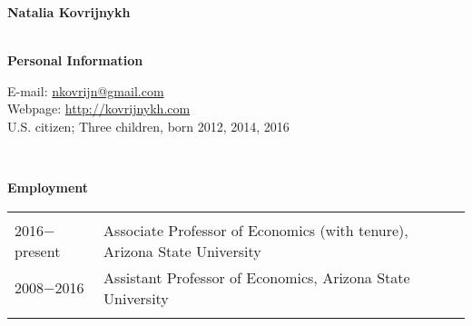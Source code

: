 \documentclass[11pt]{article}
\begin{document}
\begin{center}
{\Large\textbf{Natalia Kovrijnykh}}\\

{\large\textbf{}}\\
\end{center}


\vspace{.2cm}

\textbf{Personal Information}

\vspace{.3cm}

E-mail: \href{mailto:natalia.kovrijnykh@asu.edu}{nkovrijn@gmail.com} \\
Webpage: \href{http://www.public.asu.edu/~nkovrijn}{http://kovrijnykh.com}\\
U.S. citizen; 
Three children, born 2012, 2014, 2016

\ \

\textbf{Employment}

\begin{tabular}{l l}
 \hspace{.1in} & \\
2016$-$present \hspace{.15in} & Associate Professor of Economics (with tenure), Arizona State University \\
2008$-$2016 \hspace{.15in} & Assistant Professor of Economics, Arizona State University \\
 \hspace{.1in} & \\
\end{tabular}
\end{document}

